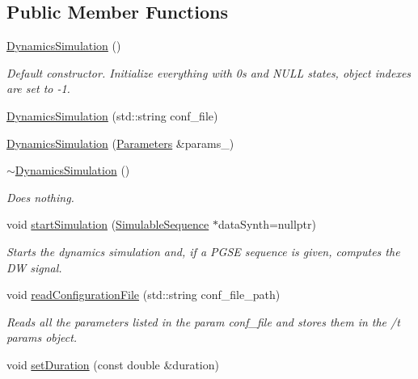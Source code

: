 \subsection*{Public Member Functions}
\begin{DoxyCompactItemize}
\item 
\hyperlink{class_dynamics_simulation_ad9a3e1f235466c3827cb49c67d3a6147}{Dynamics\+Simulation} ()
\begin{DoxyCompactList}\small\item\em Default constructor. Initialize everything with 0\textquotesingle{}s and N\+U\+LL states, object indexes are set to -\/1. \end{DoxyCompactList}\item 
\hyperlink{class_dynamics_simulation_aa603b5ba682b1b37cc96dd8be113cb52}{Dynamics\+Simulation} (std\+::string conf\+\_\+file)
\item 
\hyperlink{class_dynamics_simulation_a8fd2ec6f3640bff79e4b1ad960bbda5b}{Dynamics\+Simulation} (\hyperlink{class_parameters}{Parameters} \&params\+\_\+)
\item 
\mbox{\label{class_dynamics_simulation_a15a1f18a99d606ef2ca939e718ca996f}} 
\hyperlink{class_dynamics_simulation_a15a1f18a99d606ef2ca939e718ca996f}{$\sim$\+Dynamics\+Simulation} ()
\begin{DoxyCompactList}\small\item\em Does nothing. \end{DoxyCompactList}\item 
void \hyperlink{class_dynamics_simulation_a00cf4a6cbde1ef708fdbd58e8d8a7727}{start\+Simulation} (\hyperlink{class_simulable_sequence}{Simulable\+Sequence} $\ast$data\+Synth=nullptr)
\begin{DoxyCompactList}\small\item\em Starts the dynamics simulation and, if a P\+G\+SE sequence is given, computes the DW signal. \end{DoxyCompactList}\item 
void \hyperlink{class_dynamics_simulation_a67adab75eba635447c1b1b2b26d1e0ab}{read\+Configuration\+File} (std\+::string conf\+\_\+file\+\_\+path)
\begin{DoxyCompactList}\small\item\em Reads all the parameters listed in the param conf\+\_\+file and stores them in the /t params object. \end{DoxyCompactList}\item 
void \hyperlink{class_dynamics_simulation_a9148a30590bef5c766fd2366bbd16eb8}{set\+Duration} (const double \&duration)

\end{DoxyCompactItemize}
